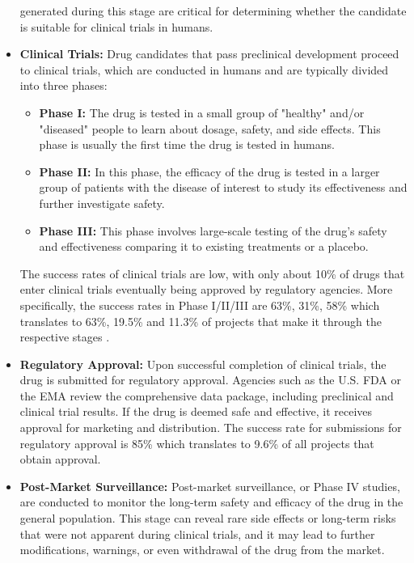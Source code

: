 \begin{itemize}
          generated during this stage are critical for determining whether the candidate is
          suitable for clinical trials in humans.
    \item \textbf{Clinical Trials:} Drug candidates that pass preclinical development proceed to
          clinical trials, which are conducted in humans and are typically divided into three phases:
          \begin{itemize}
              \item \textbf{Phase I:} The drug is tested in a small group of "healthy" and/or "diseased" people to learn about
                    dosage, safety, and side effects. This phase is usually the first time the drug is tested in humans.
              \item \textbf{Phase II:} In this phase, the efficacy of the drug is tested in a larger
                    group of patients with the disease of interest to study its effectiveness and further investigate safety.
              \item \textbf{Phase III:} This phase involves large-scale testing of the drug's safety
                    and effectiveness comparing it to existing treatments or a placebo.
          \end{itemize}
          The success rates of clinical trials are low, with only about 10\% of drugs that enter clinical
          trials eventually being approved by regulatory agencies. More specifically, the success rates in
          Phase I/II/III are 63\%, 31\%, 58\% which translates to 63\%, 19.5\% and 11.3\% of projects that
          make it through the respective stages \citep{mullardParsingClinicalSuccess2016}.
    \item \textbf{Regulatory Approval:} Upon successful completion of clinical trials, the drug is
          submitted for regulatory approval. Agencies such as the U.S. \Ac{FDA} or the \Ac{EMA}
          review the comprehensive data package, including preclinical and clinical trial results.
          If the drug is deemed safe and effective, it receives approval for marketing and
          distribution. The success rate for submissions for regulatory approval is 85\%
          \citep{mullardParsingClinicalSuccess2016} which translates to 9.6\% of all projects that
          obtain approval.
    \item \textbf{Post-Market Surveillance:} Post-market surveillance, or Phase IV studies, are
          conducted to monitor the long-term safety and efficacy of the drug in the general population.
          This stage can reveal rare side effects or long-term risks that were not apparent during
          clinical trials, and it may lead to further modifications, warnings, or even withdrawal of the
          drug from the market.
\end{itemize}

